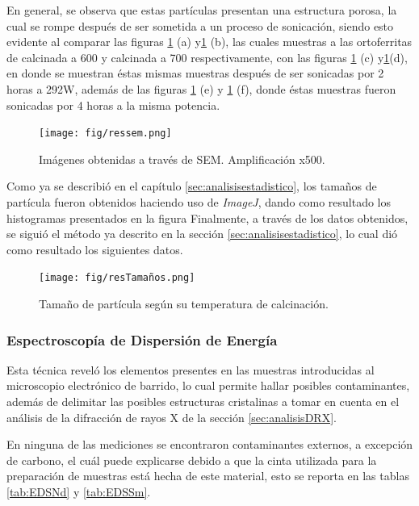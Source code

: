 \documentclass[../main.tex]{subfiles}
\begin{document}
En general, se observa que estas partículas presentan una estructura porosa, la cual se rompe después de ser sometida a un proceso de sonicación, siendo esto evidente al comparar las figuras \ref{fig:resSEMsonic} (a) y\ref{fig:resSEMsonic} (b), las cuales muestras a las ortoferritas de \neod{} calcinada a 600\gradoC{} y \sama{} calcinada a 700\gradoC{} respectivamente, con las figuras \ref{fig:resSEMsonic} (c) y\ref{fig:resSEMsonic}(d), en donde se muestran éstas mismas muestras después de ser sonicadas por 2 horas a 292W, además de las figuras \ref{fig:resSEMsonic} (e) y \ref{fig:resSEMsonic} (f), donde éstas muestras fueron sonicadas por 4 horas a la misma potencia.
\begin{figure}[H]
    \centering
    \texttt{[image: fig/ressem.png]}
    \caption{Imágenes obtenidas a través de SEM. Amplificación x500.}
    \label{fig:resSEMsonic}
\end{figure}
Como ya se describió en el capítulo \ref{sec:analisisestadistico}, los tamaños de partícula fueron obtenidos haciendo uso de \textit{ImageJ}, dando como resultado los histogramas presentados en la figura %
Finalmente, a través de los datos obtenidos, se siguió el método ya descrito en la sección \ref{sec:analisisestadistico}, lo cual dió como resultado los siguientes datos.
\begin{figure}[H]
    \centering
    \texttt{[image: fig/resTamaños.png]}
    \caption{Tamaño de partícula según su temperatura de calcinación.}
    \label{fig:resTamaños}
\end{figure}
\subsubsection{Espectroscopía de Dispersión de Energía}
Esta técnica reveló los elementos presentes en las muestras introducidas al microscopio electrónico de barrido, lo cual permite hallar posibles contaminantes, además de delimitar las posibles estructuras cristalinas a tomar en cuenta en el análisis de la difracción de rayos X de la sección \ref{sec:analisisDRX}.

En ninguna de las mediciones se encontraron contaminantes externos, a excepción de carbono, el cuál puede explicarse debido a que la cinta utilizada para la preparación de muestras está hecha de este material, esto se reporta en las tablas \ref{tab:EDSNd} y \ref{tab:EDSSm}.
\end{document}
